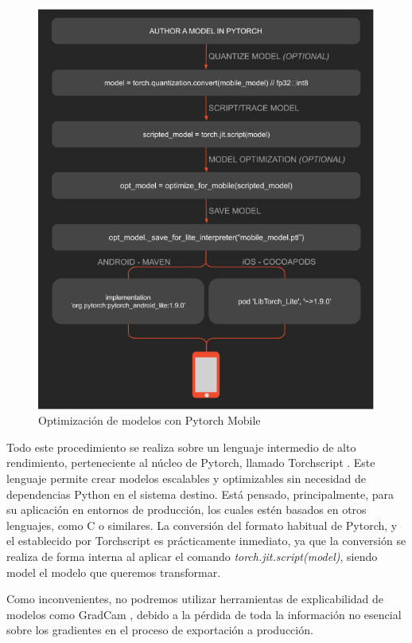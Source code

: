 \begin{figure}[H]
	\centering
	\includegraphics[scale = 0.5]{imagenes/pytorch-mobile.png}
	\caption{Optimización de modelos con Pytorch Mobile \cite{pmobile}}
	\label {fig:mobileprocess}
\end{figure}

Todo este procedimiento se realiza sobre un lenguaje intermedio de alto rendimiento, perteneciente al núcleo de Pytorch, llamado Torchscript \cite{torchscript}. Este lenguaje permite crear modelos escalables y optimizables sin necesidad de dependencias Python en el sistema destino. Está pensado, principalmente, para su aplicación en entornos de producción, los cuales estén basados en otros lenguajes, como C o similares. La conversión del formato habitual de Pytorch, y el establecido por Torchscript es prácticamente inmediato, ya que la conversión se realiza de forma interna al aplicar el comando \textit{torch.jit.script(model)}, siendo model el modelo que queremos transformar.

Como inconvenientes, no podremos utilizar herramientas de explicabilidad de modelos como GradCam \cite{Selvaraju_2019}, debido a la pérdida de toda la información no esencial sobre los gradientes en el proceso de exportación a producción.

